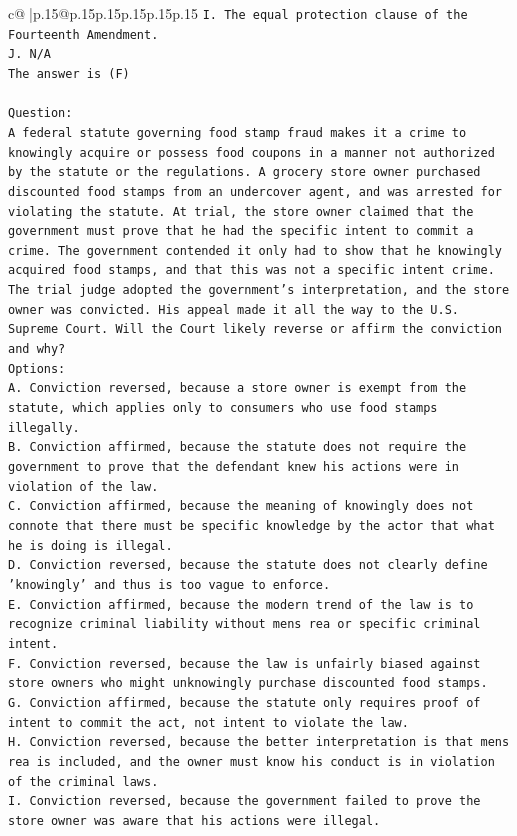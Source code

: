 \documentclass{article}
\begin{document}
{\begin{supertabular}{c@{$\;$}|p{.15\linewidth}@{}p{.15\linewidth}p{.15\linewidth}p{.15\linewidth}p{.15\linewidth}p{.15\linewidth}}
{{{\texttt{I. The equal protection clause of the Fourteenth Amendment.} \\
\texttt{J. N/A} \\
\texttt{The answer is (F)} \\
\\ 
\texttt{Question:} \\
\texttt{A federal statute governing food stamp fraud makes it a crime to knowingly acquire or possess food coupons in a manner not authorized by the statute or the regulations. A grocery store owner purchased discounted food stamps from an undercover agent, and was arrested for violating the statute. At trial, the store owner claimed that the government must prove that he had the specific intent to commit a crime. The government contended it only had to show that he knowingly acquired food stamps, and that this was not a specific intent crime. The trial judge adopted the government's interpretation, and the store owner was convicted. His appeal made it all the way to the U.S. Supreme Court. Will the Court likely reverse or affirm the conviction and why?} \\
\texttt{Options:} \\
\texttt{A. Conviction reversed, because a store owner is exempt from the statute, which applies only to consumers who use food stamps illegally.} \\
\texttt{B. Conviction affirmed, because the statute does not require the government to prove that the defendant knew his actions were in violation of the law.} \\
\texttt{C. Conviction affirmed, because the meaning of knowingly does not connote that there must be specific knowledge by the actor that what he is doing is illegal.} \\
\texttt{D. Conviction reversed, because the statute does not clearly define 'knowingly' and thus is too vague to enforce.} \\
\texttt{E. Conviction affirmed, because the modern trend of the law is to recognize criminal liability without mens rea or specific criminal intent.} \\
\texttt{F. Conviction reversed, because the law is unfairly biased against store owners who might unknowingly purchase discounted food stamps.} \\
\texttt{G. Conviction affirmed, because the statute only requires proof of intent to commit the act, not intent to violate the law.} \\
\texttt{H. Conviction reversed, because the better interpretation is that mens rea is included, and the owner must know his conduct is in violation of the criminal laws.} \\
\texttt{I. Conviction reversed, because the government failed to prove the store owner was aware that his actions were illegal.} \\
            }
        }
    }
     \\ \\


\end{supertabular}}
\end{document}
